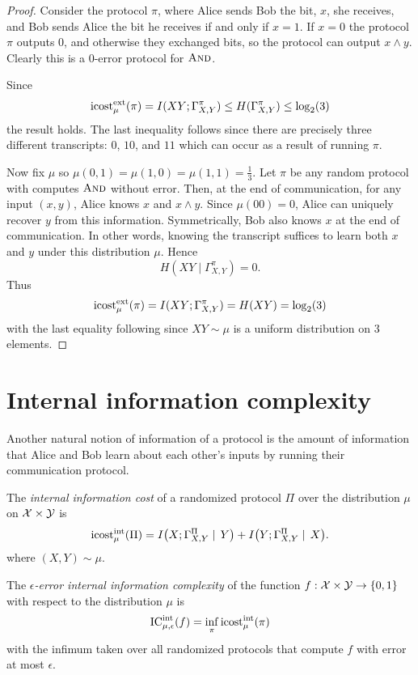 \begin{proof}
Consider the protocol $\pi$, where Alice sends Bob the bit, $x$, she receives, and Bob sends Alice the bit he receives if and only if $x=1$. If $x=0$ the protocol $\pi$ outputs $0$, and otherwise they exchanged bits, so the protocol can output $x\wedge y$. Clearly this is a $0$-error protocol for $\textsc{And}$.

Since 
$$\mathrm{icost}^{\mathrm{ext}}_\mu(\pi) = I(XY; \Gamma^\pi_{X,Y}) \leq H(\Gamma^\pi_{X,Y}) \leq \log_2(3)$$
the result holds. The last inequality follows since there are precisely three different transcripts: $0$, $10$, and $11$ which can occur as a result of running $\pi$.

Now fix $\mu$ so $\mu(0,1) = \mu(1,0) = \mu(1,1) = \frac{1}{3}$. Let $\pi$ be any random protocol with computes $\textsc{And}$ without error. Then, at the end of communication, for any input $(x,y)$, Alice knows $x$ and $x\wedge y$. Since $\mu(00) = 0$, Alice can uniquely recover $y$ from this information. Symmetrically, Bob also knows $x$ at the end of communication. In other words, knowing the transcript suffices to learn both $x$ and $y$ under this distribution $\mu$. Hence
$$H(XY \mid \Gamma^\pi_{X,Y}) = 0.$$
Thus
$$\mathrm{icost}^{\mathrm{ext}}_\mu(\pi) = I(XY;\Gamma^{\pi}_{X,Y}) = H(XY) =\log_2(3)$$
with the last equality following since $XY\sim \mu$ is a uniform distribution on $3$ elements.
\end{proof}


\newpage 
\section{Internal information complexity}

Another natural notion of information of a protocol is the amount of information that Alice and Bob learn about each other's inputs by running their communication protocol.

\begin{definition}
The \emph{internal information cost} of a randomized protocol $\Pi$ over the distribution $\mu$ on $\mathcal{X} \times \mathcal{Y}$ is
\[
\mathrm{icost}^{\mathrm{int}}_\mu(\Pi) = I\big( X ; \Gamma_{X,Y}^\Pi\mid \, Y\big) + I\big( Y ; \Gamma_{X,Y}^\Pi \mid\, X\big).
\]
where $(X,Y) \sim \mu$.
\end{definition}

\begin{definition}
The \emph{$\epsilon$-error internal information complexity} of the function $f : \mathcal{X} \times \mathcal{Y} \to \{0,1\}$ with respect to the distribution $\mu$ is
\[
\mathrm{IC}^{\mathrm{int}}_{\mu,\epsilon}(f) = \inf_{\pi} \mathrm{icost}^{\mathrm{int}}_\mu(\pi)
\]
with the infimum taken over all randomized protocols that compute $f$ with error at most $\epsilon$.
\end{definition}

